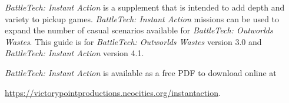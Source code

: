 \emph{BattleTech: Instant Action} is a supplement that is intended to add depth and variety to pickup games.
\emph{BattleTech: Instant Action} missions can be used to expand the number of casual scenarios available for \emph{BattleTech: Outworlds Wastes}.
This guide is for \emph{BattleTech: Outworlds Wastes} version 3.0 and \emph{BattleTech: Instant Action} version 4.1.

\emph{BattleTech: Instant Action} is available as a free PDF to download online at

 \href{https://victorypointproductions.neocities.org/instantaction}{https://victorypointproductions.neocities.org/instantaction}.
